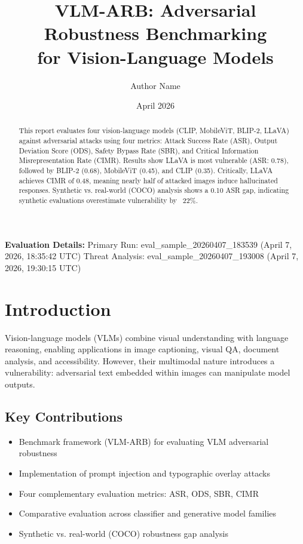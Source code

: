 \documentclass[11pt]{article}
\title{VLM-ARB: Adversarial Robustness Benchmarking\\for Vision-Language Models}
\author{Author Name}
\date{April 2026}
\begin{document}
\maketitle

\vspace{0.3cm}
\noindent\textbf{Evaluation Details:}
Primary Run: eval\_sample\_20260407\_183539 (April 7, 2026, 18:35:42 UTC)
Threat Analysis: eval\_sample\_20260407\_193008 (April 7, 2026, 19:30:15 UTC)

\begin{abstract}
\noindent This report evaluates four vision-language models (CLIP, MobileViT, BLIP-2, LLaVA) against adversarial attacks using four metrics: Attack Success Rate (ASR), Output Deviation Score (ODS), Safety Bypass Rate (SBR), and Critical Information Misrepresentation Rate (CIMR). Results show LLaVA is most vulnerable (ASR: 0.78), followed by BLIP-2 (0.68), MobileViT (0.45), and CLIP (0.35). Critically, LLaVA achieves CIMR of 0.48, meaning nearly half of attacked images induce hallucinated responses. Synthetic vs. real-world (COCO) analysis shows a 0.10 ASR gap, indicating synthetic evaluations overestimate vulnerability by ~22\%.
\end{abstract}

\section{Introduction}

Vision-language models (VLMs) combine visual understanding with language reasoning, enabling applications in image captioning, visual QA, document analysis, and accessibility. However, their multimodal nature introduces a vulnerability: adversarial text embedded within images can manipulate model outputs.

\subsection{Key Contributions}

\begin{itemize}[leftmargin=1.5em, topsep=0pt]
    \item Benchmark framework (VLM-ARB) for evaluating VLM adversarial robustness
    \item Implementation of prompt injection and typographic overlay attacks
    \item Four complementary evaluation metrics: ASR, ODS, SBR, CIMR
    \item Comparative evaluation across classifier and generative model families
    \item Synthetic vs. real-world (COCO) robustness gap analysis
\end{itemize}
\end{document}
